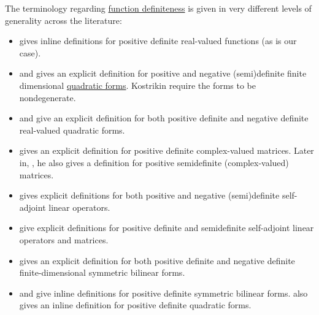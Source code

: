\begin{remark}\label{rem:real_function_definiteness_terminology}
  The terminology regarding \hyperref[def:real_function_definiteness]{function definiteness} is given in very different levels of generality across the literature:
  \begin{itemize}
    \item {} gives inline definitions for positive definite real-valued functions (as is our case).

    \item {} and  gives an explicit definition for positive and negative (semi)definite finite dimensional \hyperref[thm:quadratic_forms]{quadratic forms}. Kostrikin require the forms to be nondegenerate.

    \item {} and  give an explicit definition for both positive definite and negative definite real-valued quadratic forms.

    \item {} gives an explicit definition for positive definite complex-valued matrices. Later in, \cite[\S 33.6]{Тыртышников2007ЛинейнаяАлгебра}, he also gives a definition for positive semidefinite (complex-valued) matrices.

    \item {} gives explicit definitions for both positive and negative (semi)definite self-adjoint linear operators.

    \item {} give explicit definitions for positive definite and semidefinite self-adjoint linear operators and matrices.

    \item {} gives an explicit definition for both positive definite and negative definite finite-dimensional symmetric bilinear forms.

    \item {} and  give inline definitions for positive definite symmetric bilinear forms.  also gives an inline definition for positive definite quadratic forms.


\end{itemize}
\end{remark}
